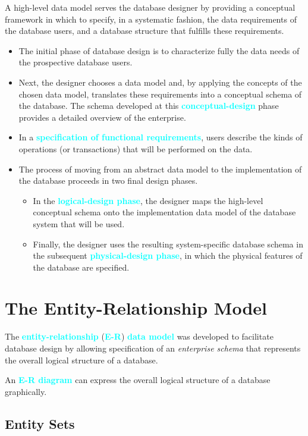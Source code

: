 \documentclass[a4paper,12pt,twoside,openany]{book}
\newcommand{\textcy}[1]{\textbf{\textcolor{cyan}{#1}}}
\begin{document}
A high-level data model serves the database designer by providing a conceptual framework in which to specify, in a systematic fashion, the data requirements of the database users, and a database structure that fulfills these requirements.
\begin{itemize}
    \item The initial phase of database design is to characterize fully the data needs of the prospective database users.
    \item Next, the designer chooses a data model and, by applying the concepts of the chosen data model, translates these requirements into a conceptual schema of the database. The schema developed at this \textcy{conceptual-design} phase provides a detailed overview of the enterprise.
    \item In a \textcy{specification of functional requirements}, users describe the kinds of operations (or transactions) that will be performed on the data.
    \item The process of moving from an abstract data model to the implementation of the database proceeds in two final design phases.
    \begin{itemize}
        \item In the \textcy{logical-design phase}, the designer maps the high-level conceptual schema onto the implementation data model of the database system that will be used.
        \item Finally, the designer uses the resulting system-specific database schema in the subsequent \textcy{physical-design phase}, in which the physical features of the database are specified.
    \end{itemize}
\end{itemize}

\section{The Entity-Relationship Model}

The \textcy{entity-relationship} (\textcy{E-R}) \textcy{data model} was developed to facilitate database design by allowing specification of an \textit{enterprise schema} that represents the overall logical structure of a database.

An \textcy{E-R diagram} can express the overall logical structure of a database graphically.

\subsection{Entity Sets}
\end{document}
